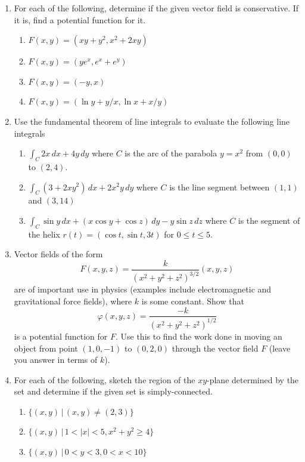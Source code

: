 \documentclass[12pt]{article}
\numberwithin{equation}{subsection}
\numberwithin{figure}{subsection}
\theoremstyle{note}
\begin{document}
{\begin{enumerate}[label=\arabic*.]
\item For each of the following, determine if the given vector field is conservative. If it is, find a potential function for it. 

\begin{enumerate}
	\item $F(x,y)=( xy+y^2, x^2+2xy)$
	\item $F(x,y)=(ye^x, e^x+e^y)$
	\item $F(x,y)=(-y,x)$
	\item $F(x,y)=(\ln y +y/x, \ln x+x/y)$
\end{enumerate}

\item Use the fundamental theorem of line integrals to evaluate the following line integrals

\begin{enumerate}
	\item $\displaystyle \int_C 2x \,dx + 4y \,dy$ where $C$ is the arc of the parabola $y=x^2$ from $(0,0)$ to $(2,4)$.
	\item $\displaystyle \int_C (3+2xy^2)\,dx+ 2x^2y\,dy$ where $C$ is the line segment between $(1,1)$ and $(3,14)$
	\item $\displaystyle \int_C \sin y \,dx + (x\cos y+\cos z) \,dy-y \sin z\,dz$ where $C$ is the segment of the helix $r(t)=(\cos t, \sin t, 3t)$ for $0\leq t\leq 5$.
\end{enumerate}

\item Vector fields of the form \[ F(x,y,z)= \dfrac{k}{(x^2+y^2+z^2)^{3/2}} (x,y,z)\] are of important use in physics (examples include electromagnetic and gravitational force fields), where $k$ is some constant. Show that \[\varphi(x,y,z)= \dfrac{-k}{(x^2+y^2+z^2)^{1/2}}\] is a potential function for $F$. Use this to find the work done in moving an object from point $(1,0,-1)$ to $(0,2,0)$ through the vector field $F$ (leave you answer in terms of $k$). 

\item For each of the following, sketch the region of the $xy$-plane determined by the set and determine if the given set is simply-connected. 

\begin{enumerate}
	\item $\{ (x,y) \, | \, (x,y)\neq (2,3) \}$ 
	\item $\{ (x,y) \, | \, 1 < |x| < 5, x^2+y^2\geq 4 \}$
	\item $\{ (x,y) \, | \, 0< y< 3, 0< x< 10\}$	
\end{enumerate}


\end{enumerate}}
\end{document}
